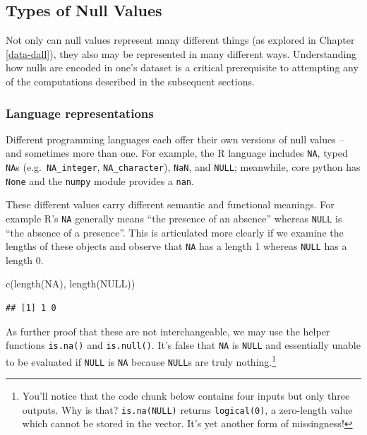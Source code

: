 \documentclass[
]{krantz}
\makeatletter
\newenvironment{Shaded}{\begin{snugshade}}{\end{snugshade}}
\newcommand{\ConstantTok}[1]{\textcolor[rgb]{0,0,0}{#1}}
\newcommand{\FunctionTok}[1]{\textcolor[rgb]{0,0,0}{#1}}
\newcommand{\NormalTok}[1]{#1}
\newenvironment{kframe}{%
\medskip{}
\setlength{\fboxsep}{.8em}
 \def\at@end@of@kframe{}%
 \ifinner\ifhmode%
  \def\at@end@of@kframe{\end{minipage}}%
  \begin{minipage}{\columnwidth}%
 \fi\fi%
 \def\FrameCommand##1{\hskip\@totalleftmargin \hskip-\fboxsep
 \colorbox{shadecolor}{##1}\hskip-\fboxsep
     \hskip-\linewidth \hskip-\@totalleftmargin \hskip\columnwidth}%
 \MakeFramed {\advance\hsize-\width
   \@totalleftmargin\z@ \linewidth\hsize
   \@setminipage}}%
 {\par\unskip\endMakeFramed%
 \at@end@of@kframe}
\renewenvironment{Shaded}{\begin{kframe}}{\end{kframe}}
\makeatother
\begin{document}
\hypertarget{types-of-null-values}{%
\subsection{Types of Null Values}\label{types-of-null-values}}

Not only can null values represent many different things (as explored in Chapter \ref{data-dall}), they also may be represented in many different ways. Understanding how nulls are encoded in one's dataset is a critical prerequisite to attempting any of the computations described in the subsequent sections.

\hypertarget{language-representations}{%
\subsubsection{Language representations}\label{language-representations}}

Different programming languages each offer their own versions of null values -- and sometimes more than one. For example, the R language includes \texttt{NA}, typed \texttt{NA}s (e.g.~\texttt{NA\_integer}, \texttt{NA\_character}), \texttt{NaN}, and \texttt{NULL}; meanwhile, core python has \texttt{None} and the \texttt{numpy} module provides a \texttt{nan}.

These different values carry different semantic and functional meanings. For example R's \texttt{NA} generally means ``the presence of an absence'' whereas \texttt{NULL} is ``the absence of a presence''. This is articulated more clearly if we examine the lengths of these objects and observe that \texttt{NA} has a length 1 whereas \texttt{NULL} has a length 0.

\begin{Shaded}
\begin{Highlighting}[]
\FunctionTok{c}\NormalTok{(}\FunctionTok{length}\NormalTok{(}\ConstantTok{NA}\NormalTok{), }\FunctionTok{length}\NormalTok{(}\ConstantTok{NULL}\NormalTok{))}
\end{Highlighting}
\end{Shaded}

\begin{verbatim}
## [1] 1 0
\end{verbatim}

As further proof that these are not interchangeable, we may use the helper functions \texttt{is.na()} and \texttt{is.null()}. It's false that \texttt{NA} is \texttt{NULL} and essentially unable to be evaluated if \texttt{NULL} is \texttt{NA} because \texttt{NULL}s are truly nothing.\footnote{You'll notice that the code chunk below contains four inputs but only three outputs. Why is that? \texttt{is.na(NULL)} returns \texttt{logical(0)}, a zero-length value which cannot be stored in the vector. It's yet another form of missingness!}
\end{document}
